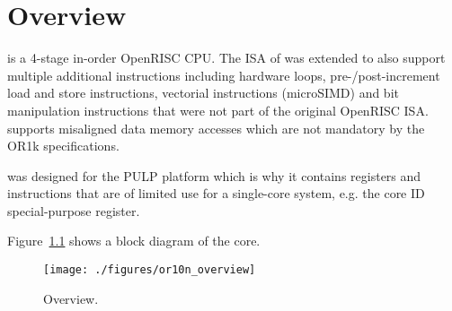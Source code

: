 \chapter{Overview}

\orion is a 4-stage in-order OpenRISC CPU. The ISA of \orion was extended to
also support multiple additional instructions including hardware loops,
pre-/post-increment load and store instructions, vectorial instructions
(microSIMD) and bit manipulation instructions that were not part of the original
OpenRISC ISA.
\orion supports misaligned data memory accesses which are not mandatory by the
OR1k specifications.

\orion was designed for the PULP platform which is why it contains registers and
instructions that are of limited use for a single-core system, e.g. the core ID
special-purpose register.

Figure~\ref{fig:or10n_overview} shows a block diagram of the core.

\begin{figure}[H]
  \centering
  \texttt{[image: ./figures/or10n\_overview]}
  \caption{\orion Overview.}
  \label{fig:or10n_overview}
\end{figure}

